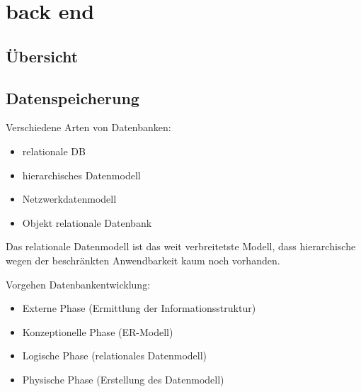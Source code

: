 \section{back end}


\subsection{Übersicht}



\subsection{Datenspeicherung}


Verschiedene Arten von Datenbanken:
\begin{itemize}
\item relationale DB
\item hierarchisches Datenmodell
\item Netzwerkdatenmodell
\item Objekt relationale Datenbank
\end{itemize}

Das relationale Datenmodell ist das weit verbreitetste Modell, dass hierarchische wegen der beschränkten Anwendbarkeit kaum noch vorhanden.

Vorgehen Datenbankentwicklung:

\begin{itemize}
\item Externe Phase (Ermittlung der Informationsstruktur)
\item Konzeptionelle Phase (ER-Modell)
\item Logische Phase (relationales Datenmodell)
\item Physische Phase (Erstellung des Datenmodell)
\end{itemize}

